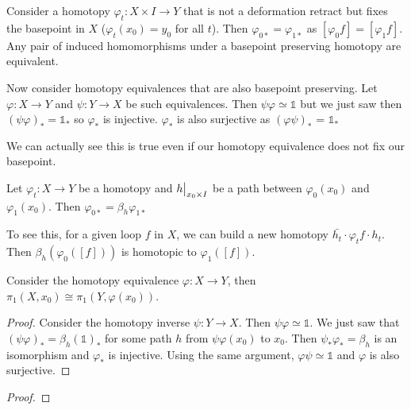 \documentclass[10pt]{article}
\newcommand\restr[2]{{%
  \left.\kern-\nulldelimiterspace %
  #1 %
  \vphantom{\big|} %
  \right|_{#2} %
}}
\begin{document}
Consider a homotopy $\varphi_t: X \times I \to Y$ that is not a deformation retract but fixes the basepoint in $X$ ($\varphi_t(x_0) = y_0$ for all $t$). Then $\varphi_{0*} = \varphi_{1*}$ as $[\varphi_0f] = [\varphi_1f]$. Any pair of induced homomorphisms under a basepoint preserving homotopy are equivalent.

Now consider homotopy equivalences that are also basepoint preserving. Let $\varphi: X \to Y$ and $\psi: Y \to X$ be such equivalences. Then $\psi\varphi \simeq \mathds{1}$ but we just saw then $(\psi\varphi)_* = \mathds{1}_*$ so $\varphi_*$ is injective. $\varphi_*$ is also surjective as $(\varphi\psi)_*$ = $\mathds{1}_*$

	We can actually see this is true even if our homotopy equivalence does not fix our basepoint.

\begin{lemma}[]
	Let $\varphi_t: X \to Y$ be a homotopy and $\restr{h}{x_0 \times I}$ be a path between $\varphi_0(x_0)$ and $\varphi_1(x_0)$. Then $\varphi_{0*} = \beta_h \varphi_{1*}$
\end{lemma}

\begin{note}
	To see this, for a given loop $f$ in $X$, we can build a new homotopy $\bar{h_t} \cdot \varphi_tf \cdot h_t$. Then $\beta_h(\varphi_0([f]))$ is homotopic to $\varphi_1([f])$.
\end{note}

\begin{theorem}
Consider the homotopy equivalence $\varphi: X \to Y$, then $\pi_1(X, x_0) \cong \pi_1(Y, \varphi(x_0))$.
\end{theorem}

\begin{proof}
	Consider the homotopy inverse $\psi: Y \to X$. Then $\psi\varphi \simeq \mathds{1}$. We just saw that $(\psi\varphi)_* = \beta_h(\mathds{1})_*$ for some path $h$ from $\psi\varphi(x_0)$ to $x_0$. Then $\psi_*\varphi_* = \beta_h$ is an isomorphism and $\varphi_*$ is injective.
	Using the same argument, $\varphi\psi \simeq \mathds{1}$ and $\varphi$ is also surjective.
\end{proof}

\begin{exercise}[]

\end{exercise}
\begin{proof}
\end{proof}
\end{document}
